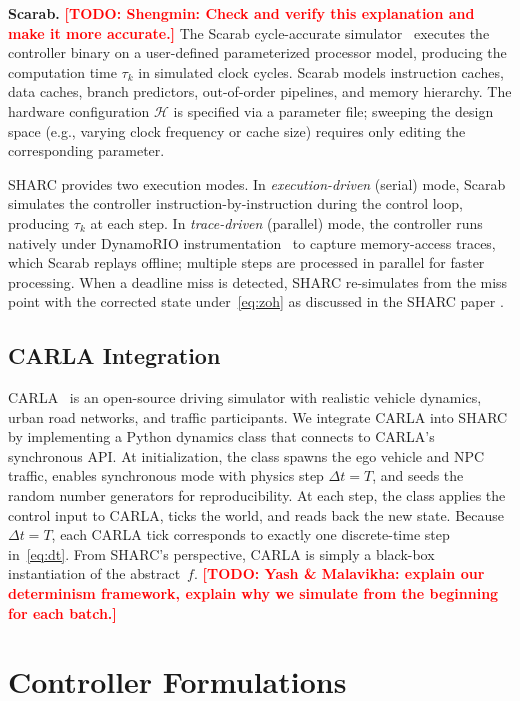 \documentclass[conference]{IEEEtran}
\newcommand{\calH}{\mathcal{H}}
\newcommand{\TODO}[1]{\textcolor{red}{\textbf{[TODO: #1]}}}
\begin{document}
\noindent\textbf{Scarab.}
\TODO{Shengmin: Check and verify this explanation and make it more accurate.}
The Scarab cycle-accurate
simulator~\cite{scarab} executes the controller binary on a user-defined parameterized processor model, producing the computation time
$\tau_k$ in simulated clock cycles.  Scarab models instruction
caches, data caches, branch predictors, out-of-order pipelines,
and memory hierarchy.  The hardware configuration $\calH$ is
specified via a parameter file; sweeping the design space
(e.g., varying clock frequency or cache size) requires only
editing the corresponding parameter.

SHARC provides two execution modes.  In
\emph{execution-driven} (serial) mode, Scarab simulates the
controller instruction-by-instruction during the control loop,
producing $\tau_k$ at each step.  In \emph{trace-driven}
(parallel) mode, the controller runs natively under DynamoRIO
instrumentation~\cite{bruening2003dynamorio} to capture
memory-access traces, which Scarab replays offline; multiple
steps are processed in parallel for faster processing.  When a deadline miss is detected, SHARC re-simulates from the miss point with the corrected state under~\eqref{eq:zoh} as discussed in the SHARC paper \cite{wintz2025sharc}.

\subsection{CARLA Integration}\label{sec:integration}

CARLA~\cite{dosovitskiy2017carla} is an open-source driving
simulator with realistic vehicle dynamics, urban road networks,
and traffic participants.  We integrate CARLA into SHARC by
implementing a Python dynamics class that connects to
CARLA's synchronous API.  At initialization, the class
spawns the ego vehicle and NPC traffic, enables synchronous
mode with physics step $\Delta t = T$, and seeds the random
number generators for reproducibility.  At each step, the
class applies the control input to CARLA, ticks the world,
and reads back the new state.  Because $\Delta t = T$, each
CARLA tick corresponds to exactly one discrete-time step
in~\eqref{eq:dt}.  From SHARC's perspective, CARLA is simply
a black-box instantiation of the abstract~$f$. \TODO{Yash \& Malavikha: explain our determinism framework, explain why we simulate from the beginning for each batch.}

\section{Controller Formulations}\label{sec:controllers}
\end{document}
